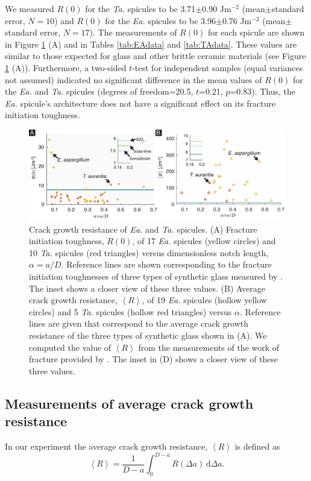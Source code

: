 \documentclass[12pt,onecolumn]{article}
\makeatletter
\newcommand{\TA}{\textit{Ta.\@}\xspace}
\newcommand{\EA}{\textit{Ea.\@}\xspace}
\makeatother
\begin{document}
\begin{bibunit}
We measured $R(0)$ for the \TA spicules to be 3.71$\pm$0.90 Jm$^{-2}$ (mean$\pm$standard error, $N=10$) and $R(0)$ for the \EA spicules to be 3.96$\pm$0.76 Jm$^{-2}$ (mean$\pm$standard error, $N=17$). The measurements of $R(0)$ for each spicule are shown in Figure \ref{fig:R} (A) and in Tables \ref{tab:EAdata} and \ref{tab:TAdata}. These values are similar to those expected for glass and other brittle ceramic materials (see Figure \ref{fig:R} (A)). Furthermore, a two-sided $t$-test for independent samples (equal variances not assumed) indicated no significant difference in the mean values of $R(0)$ for the \EA and \TA spicules (degrees of freedom=20.5, $t$=0.21, $p$=0.83). Thus, the \EA spicule's architecture does not have a significant effect on its fracture initiation toughness.
%
			\begin{figure}[ht!]
			\centering
			\includegraphics[width=\textwidth]{../Figures/FigureR/Figure5_V7.pdf}
			\caption{Crack growth resistance of \EA and \TA spicules. (A) Fracture initiation toughness, $R(0)$, of 17 \EA spicules (yellow circles) and 10 \TA spicules (red triangles) versus dimensionless notch length, $\alpha=a/D$. Reference lines are shown corresponding to the fracture initiation toughnesses of three types of synthetic glass measured by \cite{wiederhorn1969fracture}. The inset shows a closer view of these three values. (B) Average crack growth resistance, $\left< R \right>$, of 19 \EA spicules (hollow yellow circles) and 5 \TA spicules (hollow red triangles) versus $\alpha$.  Reference lines are given that correspond to the average crack growth resistance of the three types of synthetic glass shown in (A). We computed the value of $\left< R \right>$ from the measurements of the work of fracture provided by \cite{wiederhorn1969fracture}. The inset in (D) shows a closer view of these three values.}
			\label{fig:R}
			\end{figure}

\subsection{Measurements of average crack growth resistance}
\label{sec:avgR}
In our experiment the average crack growth resistance, $\left< R \right>$ is defined as
%
\begin{equation}
    \label{eq:avgRdef}
    \left< R \right> =\frac{1}{D-a}\int_0^{D-a}R(\Delta a)\,\mathrm{d}\Delta a.
\end{equation}
%


\end{bibunit}
\end{document}
